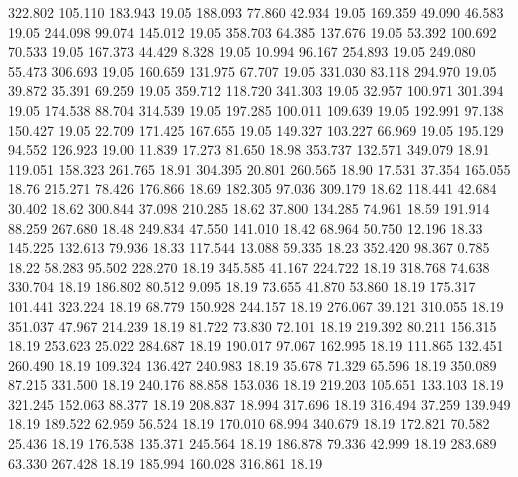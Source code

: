  322.802  105.110  183.943        19.05
 188.093   77.860   42.934        19.05
 169.359   49.090   46.583        19.05
 244.098   99.074  145.012        19.05
 358.703   64.385  137.676        19.05
  53.392  100.692   70.533        19.05
 167.373   44.429    8.328        19.05
  10.994   96.167  254.893        19.05
 249.080   55.473  306.693        19.05
 160.659  131.975   67.707        19.05
 331.030   83.118  294.970        19.05
  39.872   35.391   69.259        19.05
 359.712  118.720  341.303        19.05
  32.957  100.971  301.394        19.05
 174.538   88.704  314.539        19.05
 197.285  100.011  109.639        19.05
 192.991   97.138  150.427        19.05
  22.709  171.425  167.655        19.05
 149.327  103.227   66.969        19.05
 195.129   94.552  126.923        19.00
  11.839   17.273   81.650        18.98
 353.737  132.571  349.079        18.91
 119.051  158.323  261.765        18.91
 304.395   20.801  260.565        18.90
  17.531   37.354  165.055        18.76
 215.271   78.426  176.866        18.69
 182.305   97.036  309.179        18.62
 118.441   42.684   30.402        18.62
 300.844   37.098  210.285        18.62
  37.800  134.285   74.961        18.59
 191.914   88.259  267.680        18.48
 249.834   47.550  141.010        18.42
  68.964   50.750   12.196        18.33
 145.225  132.613   79.936        18.33
 117.544   13.088   59.335        18.23
 352.420   98.367    0.785        18.22
  58.283   95.502  228.270        18.19
 345.585   41.167  224.722        18.19
 318.768   74.638  330.704        18.19
 186.802   80.512    9.095        18.19
  73.655   41.870   53.860        18.19
 175.317  101.441  323.224        18.19
  68.779  150.928  244.157        18.19
 276.067   39.121  310.055        18.19
 351.037   47.967  214.239        18.19
  81.722   73.830   72.101        18.19
 219.392   80.211  156.315        18.19
 253.623   25.022  284.687        18.19
 190.017   97.067  162.995        18.19
 111.865  132.451  260.490        18.19
 109.324  136.427  240.983        18.19
  35.678   71.329   65.596        18.19
 350.089   87.215  331.500        18.19
 240.176   88.858  153.036        18.19
 219.203  105.651  133.103        18.19
 321.245  152.063   88.377        18.19
 208.837   18.994  317.696        18.19
 316.494   37.259  139.949        18.19
 189.522   62.959   56.524        18.19
 170.010   68.994  340.679        18.19
 172.821   70.582   25.436        18.19
 176.538  135.371  245.564        18.19
 186.878   79.336   42.999        18.19
 283.689   63.330  267.428        18.19
 185.994  160.028  316.861        18.19
